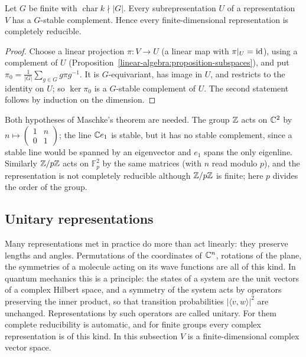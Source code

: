 \begin{theorem}[Maschke]\label{representation-theory:theorem-maschke}
Let $G$ be finite with $\operatorname{char} k \nmid |G|$. Every subrepresentation $U$ of a representation $V$ has a
$G$-stable complement. Hence every finite-dimensional representation is completely reducible.
\end{theorem}

\begin{proof}
Choose a linear projection $\pi \colon V \to U$ (a linear map with $\pi|_U = \mathrm{id}$), using a complement of $U$
(Proposition~\ref{linear-algebra:proposition-subspaces}), and put
$\pi_0 = \frac{1}{|G|}\sum_{g \in G} g\pi g^{-1}$. It is $G$-equivariant, has image in $U$, and restricts to the identity
on $U$; so $\ker\pi_0$ is a $G$-stable complement of $U$. The second statement follows by induction on the
dimension.
\end{proof}

\begin{counterexample}\label{representation-theory:counterexample-not-semisimple}
Both hypotheses of Maschke's theorem are needed. The group $\mathbb{Z}$ acts on $\mathbb{C}^2$ by
$n \mapsto \begin{pmatrix} 1 & n \\ 0 & 1 \end{pmatrix}$; the line $\mathbb{C} e_1$ is stable, but it has no stable complement, since a
stable line would be spanned by an eigenvector and $e_1$ spans the only eigenline. Similarly $\mathbb{Z}/p\mathbb{Z}$ acts on
$\mathbb{F}_p^2$ by the same matrices (with $n$ read modulo $p$), and the representation is not completely
reducible although $\mathbb{Z}/p\mathbb{Z}$ is finite; here $p$ divides the order of the group.
\end{counterexample}

\subsection{Unitary representations}\label{representation-theory:subsection-unitary}

Many representations met in practice do more than act linearly: they preserve lengths and angles. Permutations of the coordinates of $\mathbb{C}^n$, rotations of the plane, the symmetries
of a molecule acting on its wave functions are all of this kind. In quantum mechanics this is a principle: the states of a system are the unit vectors of a complex Hilbert space, and a
symmetry of the system acts by operators preserving the inner product, so that transition probabilities $|\langle v, w\rangle|^2$ are unchanged. Representations by such operators are
called unitary. For them complete reducibility is automatic, and for finite groups every complex representation is of this kind. In this subsection $V$ is a finite-dimensional
complex vector space.

